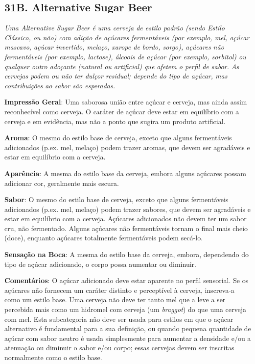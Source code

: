 \subsection*{31B. Alternative Sugar Beer}
\textit{Uma Alternative Sugar Beer é uma cerveja de estilo padrão (sendo Estilo Clássico, ou não) com adição de açúcares fermentáveis (por exemplo, mel, açúcar mascavo, açúcar invertido, melaço, xarope de bordo, sorgo), açúcares não fermentáveis (por exemplo, lactose), álcoois de açúcar (por exemplo, sorbitol) ou qualquer outro adoçante (natural ou artificial) que afetem o perfil de sabor. As cervejas podem ou não ter dulçor residual; depende do tipo de açúcar, mas contribuições ao sabor são esperadas.}

\textbf{Impressão Geral}: Uma saborosa união entre açúcar e cerveja, mas ainda assim reconhecível como cerveja. O caráter de açúcar deve estar em equilíbrio com a cerveja e em evidência, mas não a ponto que sugira um produto artificial.

\textbf{Aroma}: O mesmo do estilo base de cerveja, exceto que alguns fermentáveis adicionados (p.ex. mel, melaço) podem trazer aromas, que devem ser agradáveis e estar em equilíbrio com a cerveja.

\textbf{Aparência}: A mesma do estilo base da cerveja, embora alguns açúcares possam adicionar cor, geralmente mais escura.

\textbf{Sabor}: O mesmo do estilo base de cerveja, exceto que alguns fermentáveis adicionados (p.ex. mel, melaço) podem trazer sabores, que devem ser agradáveis e estar em equilíbrio com a cerveja. Açúcares adicionados não devem ter um sabor cru, não fermentado. Alguns açúcares não fermentáveis tornam o final mais cheio (doce), enquanto açúcares totalmente fermentáveis podem secá-lo.

\textbf{Sensação na Boca}: A mesma do estilo base da cerveja, embora, dependendo do tipo de açúcar adicionado, o corpo possa aumentar ou diminuir.

\textbf{Comentários}: O açúcar adicionado deve estar aparente no perfil sensorial. Se os açúcares não fornecem um caráter distinto e perceptível à cerveja, inscreva-a como um estilo base. Uma cerveja não deve ter tanto mel que a leve a ser percebida mais como um hidromel com cerveja (um \textit{braggot}) do que uma cerveja com mel. Esta subcategoria não deve ser usada para estilos em que o açúcar alternativo é fundamental para a sua definição, ou quando pequena quantidade de açúcar com sabor neutro é usada simplesmente para aumentar a densidade e/ou a atenuação ou diminuir o sabor e/ou corpo; essas cervejas devem ser inscritas normalmente como o estilo base.

